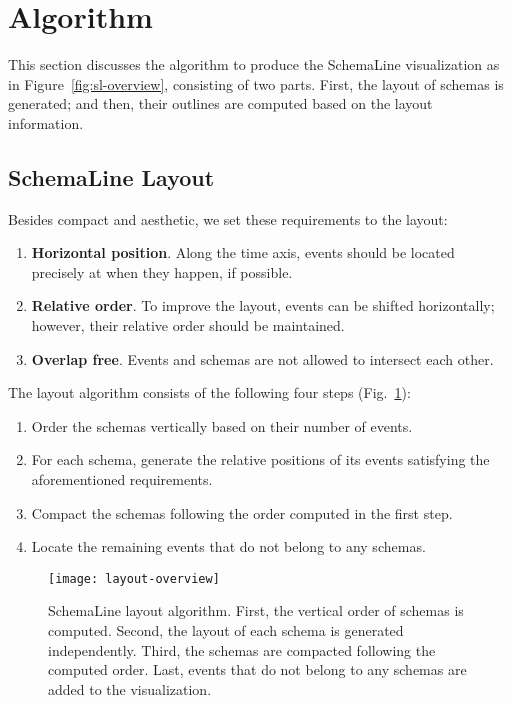 \section{Algorithm}
\label{sec:layout}

This section discusses the algorithm to produce the SchemaLine visualization as in Figure~\ref{fig:sl-overview}, consisting of two parts. First, the layout of schemas is generated; and then, their outlines are computed based on the layout information.

\subsection{SchemaLine Layout}

Besides compact and aesthetic, we set these requirements to the layout: 
\begin{enumerate}
	\item \textbf{Horizontal position}. Along the time axis, events should be located precisely at when they happen, if possible.
	\item \textbf{Relative order}. To improve the layout, events can be shifted horizontally; however, their relative order should be maintained. 
	\item \textbf{Overlap free}. Events and schemas are not allowed to intersect each other.
\end{enumerate}

The layout algorithm consists of the following four steps (Fig.~\ref{fig:sl-layout-overview}):
\begin{enumerate} 
	\item Order the schemas vertically based on their number of events.
	\item For each schema, generate the relative positions of its events satisfying the aforementioned requirements.
	\item Compact the schemas following the order computed in the first step.
	\item Locate the remaining events that do not belong to any schemas. 
\end{enumerate}

\begin{figure}[!htb]
\centering
\texttt{[image: layout-overview]}
\caption{SchemaLine layout algorithm. First, the vertical order of schemas is computed. Second, the layout of each schema is generated independently. Third, the schemas are compacted following the computed order. Last, events that do not belong to any schemas are added to the visualization.}
\label{fig:sl-layout-overview}
\end{figure}

